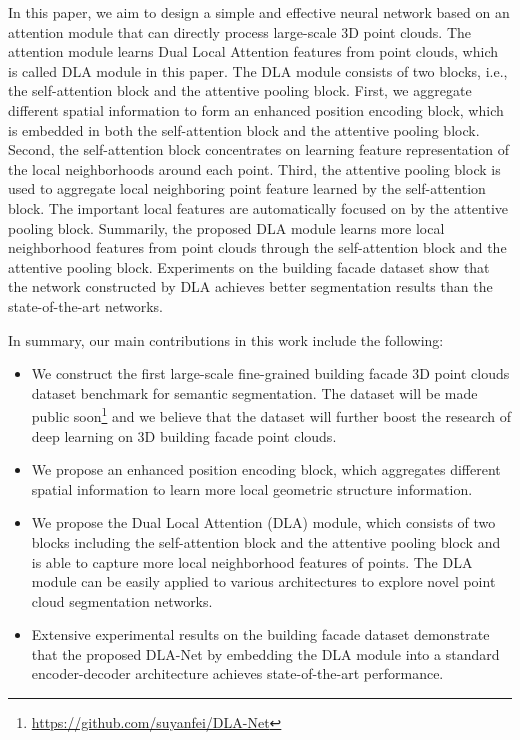 \documentclass[review]{elsarticle}
\begin{document}
In this paper, we aim to design a simple and effective neural network based on an attention module that can directly process large-scale 3D point clouds. The attention module learns Dual Local Attention features from point clouds, which is called DLA module in this paper. The DLA module consists of two blocks, i.e., the self-attention block and the attentive pooling block. First, we aggregate different spatial information to form an enhanced position encoding block, which is embedded in both the self-attention block and the attentive pooling block. Second, the self-attention block concentrates on learning feature representation of the local neighborhoods around each point. Third, the attentive pooling block is used to aggregate local neighboring point feature learned by the self-attention block. The important local features are automatically focused on by the attentive pooling block. Summarily, the proposed DLA module learns more local neighborhood features from point clouds through the self-attention block and the attentive pooling block. Experiments on the building facade dataset show that the network constructed by DLA achieves better segmentation results than the state-of-the-art networks.

In summary, our main contributions in this work include the following:
\begin{itemize}
\item We construct the first large-scale fine-grained building facade 3D point clouds dataset benchmark for semantic segmentation. The dataset will be made public soon\footnote{\url{https://github.com/suyanfei/DLA-Net}} and we believe that the dataset will further boost the research of deep learning on 3D building facade point clouds.
\item We propose an enhanced position encoding block, which aggregates different spatial information to learn more local geometric structure information.
\item We propose the Dual Local Attention (DLA) module, which consists of two blocks including the self-attention block and the attentive pooling block and is able to capture more local neighborhood features of points. The DLA module can be easily applied to various architectures to explore novel point cloud segmentation networks.
\item Extensive experimental results on the building facade dataset demonstrate that the proposed DLA-Net by embedding the DLA module into a standard encoder-decoder architecture achieves state-of-the-art performance.
\end{itemize}
\end{document}
